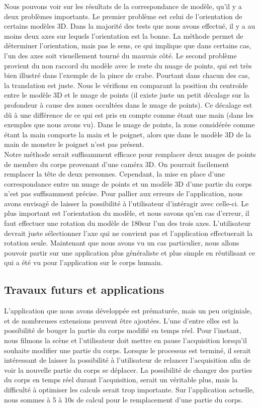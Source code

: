 Nous pouvons voir sur les résultats de la correspondance de modèle, qu'il y a deux problèmes importants. Le premier problème est celui de l'orientation
de certains modèles 3D. Dans la majorité des tests que nous avons effectué, il y a au moins deux axes sur lequels l'orientation est la bonne. La méthode 
permet de déterminer l'orientation, mais pas le sens, ce qui implique que dans certains cas, l'un des axes soit visuellement tourné du mauvais côté.
Le second problème provient du non raccord du modèle avec le reste du nuage de points, qui est très bien illustré dans l'exemple de la pince de crabe.
Pourtant dans chacun des cas, la translation est juste. Nous le vérifions en comparant la position du centroïde entre le modèle 3D et le nuage de points
(il existe juste un petit décalage sur la profondeur à cause des zones occultées dans le nuage de points). Ce décalage est dû à une différence de ce qui est 
pris en compte comme étant une main (dans les exemples que nous avons vu). Dans le nuage de points, la zone considérée comme étant la main comporte la main et le poignet, alors que 
dans le modèle 3D de la main de monstre le poignet n'est pas présent.\\

Notre méthode serait suffisamment efficace pour remplacer deux nuages de points de membre du corps provenant d'une caméra 3D. On pourrait facilement
remplacer la tête de deux personnes.
Cependant, la mise en place d'une correspondance entre un nuage de points et un modèle 3D d'une partie du corps n'est pas suffisamment précise. Pour pallier
aux erreurs de l'application, nous avons envisagé de laisser la possibilité à l'utilisateur d'intéragir avec celle-ci. Le plus important est l'orientation
du modèle, et nous savons qu'en cas d'erreur, il faut effectuer une rotation du modèle de 180\degre sur l'un des trois axes. L'utilisateur devrait juste
sélectionner l'axe qui ne convient pas et l'application effectuerait la rotation seule. Maintenant que nous avons vu un cas particulier, nous allons pouvoir
partir sur une application plus généraliste et plus simple en réutilisant ce qui a été vu pour l'application sur le corps humain.  

\subsection{Travaux futurs et applications}
L'application que nous avons développée est prématurée, mais un peu originiale, et de nombreuses extensions peuvent être ajoutées.
L'une d'entre elles est la possibilité de bouger la partie du corps modifié en temps réel. Pour l'instant, nous filmons
la scène et l'utilisateur doit mettre en pause l'acquisition lorsqu'il souhaite modifier une partie du corps. Lorsque le
processus est terminé, il serait intéressant de laisser la possibilité à l'utilisateur de relancer l'acquisition afin de
voir la nouvelle partie du corps se déplacer. La possibilité de changer des parties du corps en temps réel durant 
l'acquisition, serait un véritable plus, mais la difficulté à optimiser les calculs serait trop importante. Sur l'application
actuelle, nous sommes à 5 à 10s de calcul pour le remplacement d'une partie du corps.\\

